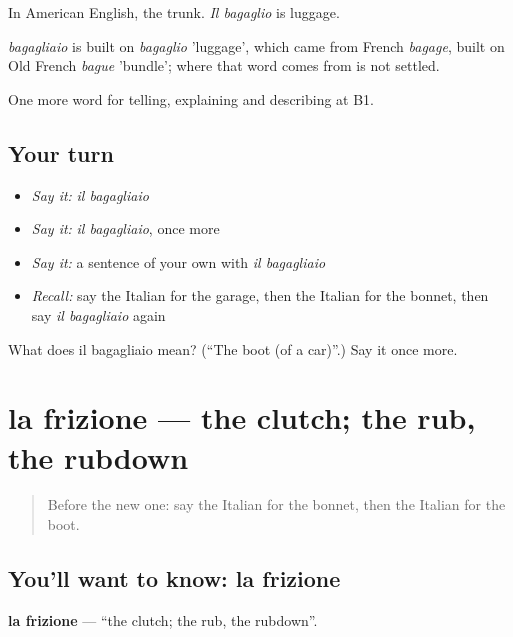 In American English, the trunk. \emph{Il bagaglio} is luggage.

\begin{cousinweb}
\emph{bagagliaio} is built on \emph{bagaglio} 'luggage', which came from French \emph{bagage}, built on Old French \emph{bague} 'bundle'; where that word comes from is not settled.
\end{cousinweb}

\begin{grammarlens}[title={What you've built}]
One more word for telling, explaining and describing at B1.
\end{grammarlens}

\subsection*{Your turn}
\begin{itemize}
\raggedright
  \item \emph{Say it:} \emph{il bagagliaio}
  \item \emph{Say it:} \emph{il bagagliaio}, once more
  \item \emph{Say it:} a sentence of your own with \emph{il bagagliaio}
  \item \emph{Recall:} say the Italian for the garage, then the Italian for the bonnet, then say \emph{il bagagliaio} again
\end{itemize}

\begin{tcolorbox}[breakable,colback=teal!4,colframe=teal!35!black,title={Before you move on}]
What does il bagagliaio mean? (\textquotedblleft{}The boot (of a car)\textquotedblright{}.) Say it once more.
\end{tcolorbox}
\section[la frizione]{la frizione — the clutch; the rub, the rubdown}

\label{lesson:IT-C411-frizione}



\begin{quote}
Before the new one: say the Italian for the bonnet, then the Italian for the boot.
\end{quote}

\subsection*{You'll want to know: la frizione}
\textbf{la frizione} — \textquotedblleft{}the clutch; the rub, the rubdown\textquotedblright{}.

